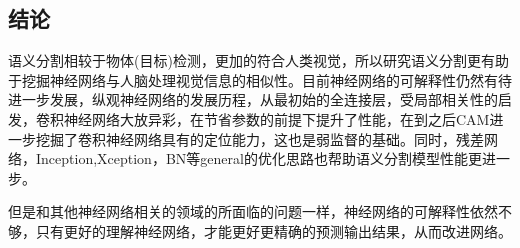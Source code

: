 \documentclass{article}
\begin{document}
\begin{CJK}{UTF8}{gbsn}
\section{结论}
语义分割相较于物体(目标)检测，更加的符合人类视觉，所以研究语义分割更有助于挖掘神经网络与人脑处理视觉信息的相似性。目前神经网络的可解释性仍然有待进一步发展，纵观神经网络的发展历程，从最初始的全连接层，受局部相关性的启发，卷积神经网络大放异彩，在节省参数的前提下提升了性能，在到之后CAM\cite{zhou2016learning}进一步挖掘了卷积神经网络具有的定位能力，这也是弱监督的基础。同时，残差网络，Inception,Xception，BN\cite{ioffe2015batch}等general的优化思路也帮助语义分割模型性能更进一步。

但是和其他神经网络相关的领域的所面临的问题一样，神经网络的可解释性依然不够，只有更好的理解神经网络，才能更好更精确的预测输出结果，从而改进网络。















\end{CJK}
\end{document}
